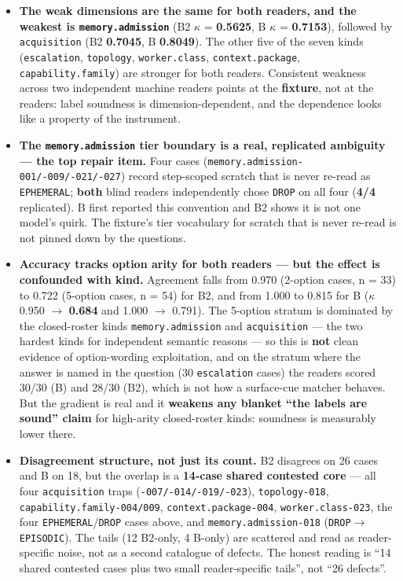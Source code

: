\documentclass[10pt]{article}
\begin{document}
\begin{itemize}
\item \textbf{The weak dimensions are the same for both readers, and the weakest is \texttt{memory.admission}} (B2 $\kappa$ = \textbf{0.5625}, B $\kappa$ = \textbf{0.7153}), followed by \texttt{acquisition} (B2 \textbf{0.7045}, B \textbf{0.8049}). The other five of the seven kinds (\texttt{escalation}, \texttt{topology}, \texttt{worker.class}, \texttt{context.package}, \texttt{capability.family}) are stronger for both readers. Consistent weakness across two independent machine readers points at the \textbf{fixture}, not at the readers: label soundness is dimension-dependent, and the dependence looks like a property of the instrument.
\item \textbf{The \texttt{memory.admission} tier boundary is a real, replicated ambiguity --- the top repair item.} Four cases (\texttt{memory.admission-001/-009/-021/-027}) record step-scoped scratch that is never re-read as \texttt{EPHEMERAL}; \textbf{both} blind readers independently chose \texttt{DROP} on all four (\textbf{4/4} replicated). B first reported this convention and B2 shows it is not one model's quirk. The fixture's tier vocabulary for scratch that is never re-read is not pinned down by the questions.
\item \textbf{Accuracy tracks option arity for both readers --- but the effect is confounded with kind.} Agreement falls from 0.970 (2-option cases, n = 33) to 0.722 (5-option cases, n = 54) for B2, and from 1.000 to 0.815 for B ($\kappa$ 0.950 $\to$ \textbf{0.684} and 1.000 $\to$ 0.791). The 5-option stratum is dominated by the closed-roster kinds \texttt{memory.admission} and \texttt{acquisition} --- the two hardest kinds for independent semantic reasons --- so this is \textbf{not} clean evidence of option-wording exploitation, and on the stratum where the answer is named in the question (30 \texttt{escalation} cases) the readers scored 30/30 (B) and 28/30 (B2), which is not how a surface-cue matcher behaves. But the gradient is real and it \textbf{weakens any blanket ``the labels are sound'' claim} for high-arity closed-roster kinds: soundness is measurably lower there.
\item \textbf{Disagreement structure, not just its count.} B2 disagrees on 26 cases and B on 18, but the overlap is a \textbf{14-case shared contested core} --- all four \texttt{acquisition} traps (\texttt{-007/-014/-019/-023}), \texttt{topology-018}, \texttt{capability.family-004/009}, \texttt{context.package-004}, \texttt{worker.class-023}, the four \texttt{EPHEMERAL}/\texttt{DROP} cases above, and \texttt{memory.admission-018} (\texttt{DROP$\to$EPISODIC}). The tails (12 B2-only, 4 B-only) are scattered and read as reader-specific noise, not as a second catalogue of defects. The honest reading is ``14 shared contested cases plus two small reader-specific tails'', not ``26 defects''.
\end{itemize}
\end{document}
